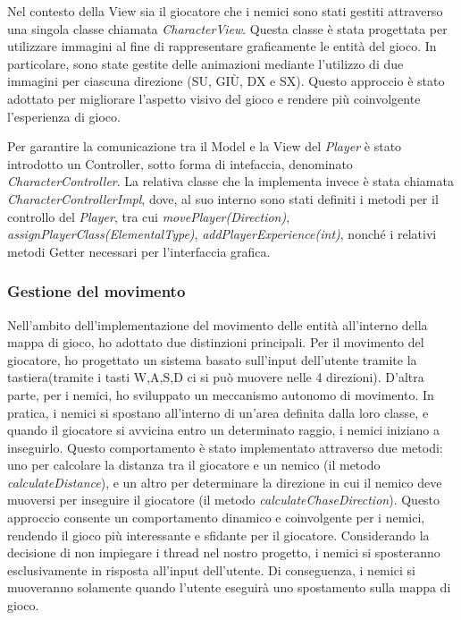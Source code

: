 \documentclass[a4paper,12pt]{report}
\begin{document}
Nel contesto della View sia il giocatore che i nemici sono stati gestiti attraverso una singola classe chiamata \textit{CharacterView}. Questa classe è stata progettata per utilizzare immagini al fine di rappresentare graficamente le entità del gioco. In particolare, sono state gestite delle animazioni mediante l'utilizzo di due immagini per ciascuna direzione (SU, GIÙ, DX e SX). Questo approccio è stato adottato per migliorare l'aspetto visivo del gioco e rendere più coinvolgente l'esperienza di gioco.

Per garantire la comunicazione tra il Model e la View del \textit{Player} è stato introdotto un Controller, sotto forma di intefaccia, denominato \textit{CharacterController}. La relativa classe che la implementa invece è stata chiamata \textit{CharacterControllerImpl}, dove, al suo interno sono stati definiti i metodi per il controllo del \textit{Player}, tra cui \textit{movePlayer(Direction)}, \textit{assignPlayerClass(ElementalType)}, \textit{addPlayerExperience(int)}, nonché i relativi metodi Getter necessari per l'interfaccia grafica.

\subsubsection{Gestione del movimento}
Nell'ambito dell'implementazione del movimento delle entità all'interno della mappa di gioco, ho adottato due distinzioni principali. Per il movimento del giocatore, ho progettato un sistema basato sull'input dell'utente tramite la tastiera(tramite i tasti W,A,S,D ci si può muovere nelle 4 direzioni). D'altra parte, per i nemici, ho sviluppato un meccanismo autonomo di movimento. In pratica, i nemici si spostano all'interno di un'area definita dalla loro classe, e quando il giocatore si avvicina entro un determinato raggio, i nemici iniziano a inseguirlo. Questo comportamento è stato implementato attraverso due metodi: uno per calcolare la distanza tra il giocatore e un nemico (il metodo \textit{calculateDistance}), e un altro per determinare la direzione in cui il nemico deve muoversi per inseguire il giocatore (il metodo \textit{calculateChaseDirection}). Questo approccio consente un comportamento dinamico e coinvolgente per i nemici, rendendo il gioco più interessante e sfidante per il giocatore.
Considerando la decisione di non impiegare i thread nel nostro progetto, i nemici si sposteranno esclusivamente in risposta all'input dell'utente. Di conseguenza, i nemici si muoveranno solamente quando l'utente eseguirà uno spostamento sulla mappa di gioco.
\end{document}
